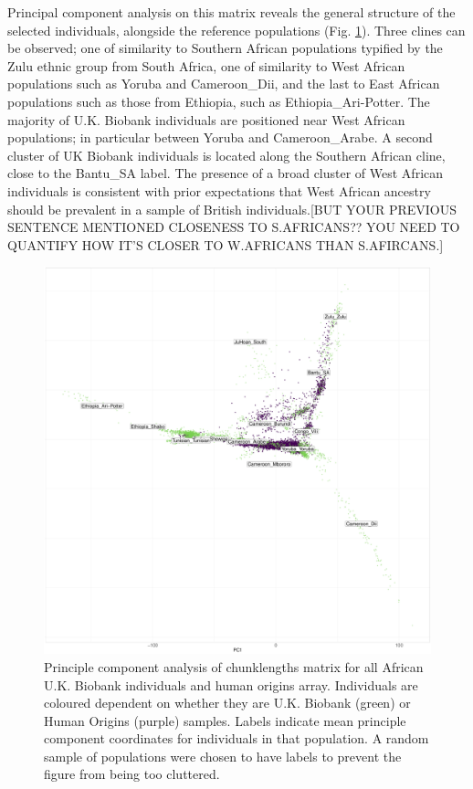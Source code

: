Principal component analysis on this matrix reveals the general structure of the selected individuals, alongside the reference populations (Fig. \ref{fig:PCA_chunklengths_HumanOrigins_U.K.Biobank}). Three clines can be observed; one of similarity to Southern African populations typified by the Zulu ethnic group from South Africa, one of similarity to West African populations such as Yoruba and Cameroon\_Dii, and the last to East African populations such as those from Ethiopia, such as Ethiopia\_Ari-Potter. The majority of U.K. Biobank individuals are positioned near West African populations; in particular between Yoruba and Cameroon\_Arabe. A second cluster of UK Biobank individuals is located along the Southern African cline, close to the Bantu\_SA label. {\color{red}The presence of a broad cluster of West African individuals is consistent with prior expectations that West African ancestry should be prevalent in a sample of British individuals.[BUT YOUR PREVIOUS SENTENCE MENTIONED CLOSENESS TO S.AFRICANS?? YOU NEED TO QUANTIFY HOW IT'S CLOSER TO W.AFRICANS THAN S.AFIRCANS.]}

\begin{figure}[htp]
    \centering
    \includegraphics[width=1.0\textwidth]{../images/chapter3/ChromoPainter_PCA_UKB_HO.pdf}
    \caption{Principle component analysis of chunklengths matrix for all African U.K. Biobank individuals and human origins array. Individuals are coloured dependent on whether they are U.K. Biobank (green) or Human Origins (purple) samples. Labels indicate mean principle component coordinates for individuals in that population. A random sample of populations were chosen to have labels to prevent the figure from being too cluttered.}
    \label{fig:PCA_chunklengths_HumanOrigins_U.K.Biobank}
\end{figure}

